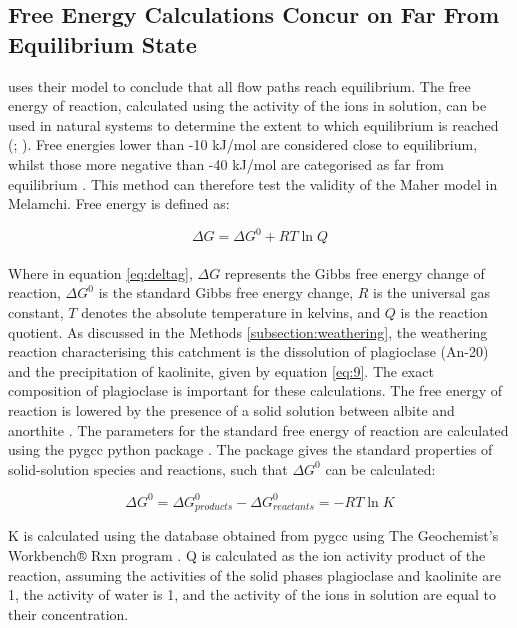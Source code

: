 \subsection{Free Energy Calculations Concur on Far From Equilibrium State}

\textcite{maherRoleFluidResidence2011} uses their model to conclude that all flow paths reach equilibrium. The free energy of reaction, calculated using the activity of the ions in solution, can be used in natural systems to determine the extent to which equilibrium is reached (\cite{kampmanFeldsparDissolutionKinetics2009}; \cite{wojtowiczThermodynamicBasisSaturation}). Free energies lower than -10 kJ/mol are considered close to equilibrium, whilst those more negative than -40 kJ/mol are categorised as far from equilibrium \parencite{kampmanFeldsparDissolutionKinetics2009}. This method can therefore test the validity of the Maher model in Melamchi. Free energy is defined as:

\begin{equation}
    \Delta G = \Delta G^0 + RT \ln Q
    \label{eq:deltag}
\end{equation}\\

Where in equation \ref{eq:deltag}, $\Delta G$ represents the Gibbs free energy change of reaction, $\Delta G^0$ is the standard Gibbs free energy change, $R$ is the universal gas constant, $T$ denotes the absolute temperature in kelvins, and $Q$ is the reaction quotient. As discussed in the Methods \ref{subsection:weathering}, the weathering reaction characterising this catchment is the dissolution of plagioclase (An-20) and the precipitation of kaolinite, given by equation \ref{eq:9}. The exact composition of plagioclase is important for these calculations. The free energy of reaction is lowered by the presence of a solid solution between albite and anorthite \parencite{dubacqThermodynamicsOrderingMixing2022}. The parameters for the standard free energy of reaction are calculated using the pygcc python package \parencite{awolayoPyGeochemCalcPython2022}. The package gives the standard properties of solid-solution species and reactions, such that $\Delta G^0$ can be calculated:

\begin{equation}
    \Delta G^0 = \Delta G^0_{products} - \Delta G^0_{reactants} = -RT \ln K
\end{equation}

K is calculated using the database obtained from pygcc using The Geochemist's Workbench® Rxn program \parencite{bethkeGEOCHEMICALBIOGEOCHEMICALREACTION}. Q is calculated as the ion activity product of the reaction, assuming the activities of the solid phases plagioclase and kaolinite are 1, the activity of water is 1, and the activity of the ions in solution are equal to their concentration.


